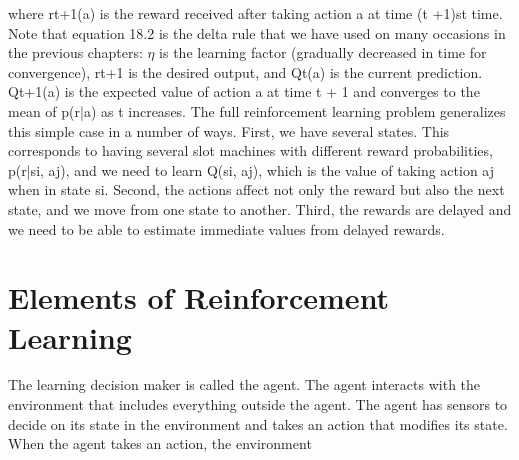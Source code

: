 where rt+1(a) is the reward received after taking action a at time (t +1)st time. Note that equation 18.2 is the delta rule that we have used on many occasions in the previous chapters: $\eta$ is the learning factor (gradually decreased in time for convergence), rt+1 is the desired output, and Qt(a) is the current prediction. Qt+1(a) is the expected value of action a at time t + 1 and converges to the mean of p(r|a) as t increases. The full reinforcement learning problem generalizes this simple case in a number of ways. First, we have several states. This corresponds to having several slot machines with different reward probabilities, p(r|si, aj), and we need to learn Q(si, aj), which is the value of taking action aj when in state si. Second, the actions affect not only the reward but also the next state, and we move from one state to another. Third, the rewards are delayed and we need to be able to estimate immediate values from delayed rewards.

\section{Elements of Reinforcement Learning}

The learning decision maker is called the agent. The agent interacts with the environment that includes everything outside the agent. The agent has sensors to decide on its state in the environment and takes an action that modifies its state. When the agent takes an action, the environment

